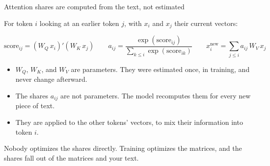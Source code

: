 \documentclass[aspectratio=169,11pt]{beamer}
\begin{document}
\begin{frame}{Attention shares are computed from the text, not estimated}

For token $i$ looking at an earlier token $j$, with $x_i$ and $x_j$ their current vectors:

\vspace{-0.1cm}
\[
\text{score}_{ij} = (W_Q\, x_i)'(W_K\, x_j)
\qquad
a_{ij} = \frac{\exp(\text{score}_{ij})}{\sum_{k \le i}\exp(\text{score}_{ik})}
\qquad
x_i^{\text{new}} = \sum_{j \le i} a_{ij}\, W_V\, x_j
\]

\begin{itemize}\setlength\itemsep{0.3em}
    \item $W_Q$, $W_K$, and $W_V$ are parameters. They were estimated once, in training, and never change afterward.
    \item The shares $a_{ij}$ are not parameters. The model recomputes them for every new piece of text.
    \item They are applied to the other tokens' vectors, to mix their information into token $i$.
\end{itemize}

\vspace{0.3cm}

\alert{Nobody optimizes the shares directly. Training optimizes the matrices, and the shares fall out of the matrices and your text.}

\end{frame}
\end{document}
